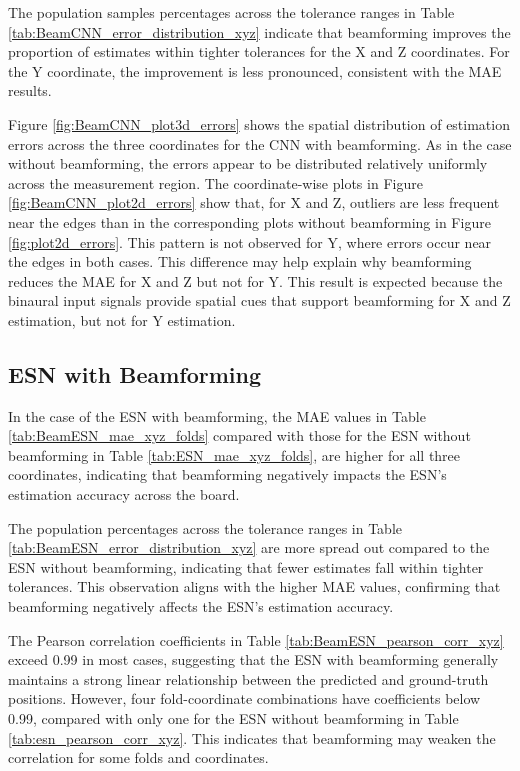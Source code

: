 The population samples percentages across the tolerance ranges in Table \ref{tab:BeamCNN_error_distribution_xyz} indicate that beamforming improves the proportion of estimates within tighter tolerances for the X and Z coordinates. For the Y coordinate, the improvement is less pronounced, consistent with the MAE results.

Figure \ref{fig:BeamCNN_plot3d_errors} shows the spatial distribution of estimation errors across the three coordinates for the CNN with beamforming. As in the case without beamforming, the errors appear to be distributed relatively uniformly across the measurement region. The coordinate-wise plots in Figure \ref{fig:BeamCNN_plot2d_errors} show that, for X and Z, outliers are less frequent near the edges than in the corresponding plots without beamforming in Figure \ref{fig:plot2d_errors}. This pattern is not observed for Y, where errors occur near the edges in both cases. This difference may help explain why beamforming reduces the MAE for X and Z but not for Y. This result is expected because the binaural input signals provide spatial cues that support beamforming for X and Z estimation, but not for Y estimation.

\subsection{ESN with Beamforming}

In the case of the ESN with beamforming, the MAE values in Table \ref{tab:BeamESN_mae_xyz_folds} compared with those for the ESN without beamforming in Table \ref{tab:ESN_mae_xyz_folds}, are higher for all three coordinates, indicating that beamforming negatively impacts the ESN's estimation accuracy across the board.

The population percentages across the tolerance ranges in Table \ref{tab:BeamESN_error_distribution_xyz} are more spread out compared to the ESN without beamforming, indicating that fewer estimates fall within tighter tolerances. This observation aligns with the higher MAE values, confirming that beamforming negatively affects the ESN's estimation accuracy.

The Pearson correlation coefficients in Table \ref{tab:BeamESN_pearson_corr_xyz} exceed 0.99 in most cases, suggesting that the ESN with beamforming generally maintains a strong linear relationship between the predicted and ground-truth positions. However, four fold-coordinate combinations have coefficients below 0.99, compared with only one for the ESN without beamforming in Table \ref{tab:esn_pearson_corr_xyz}. This indicates that beamforming may weaken the correlation for some folds and coordinates.

